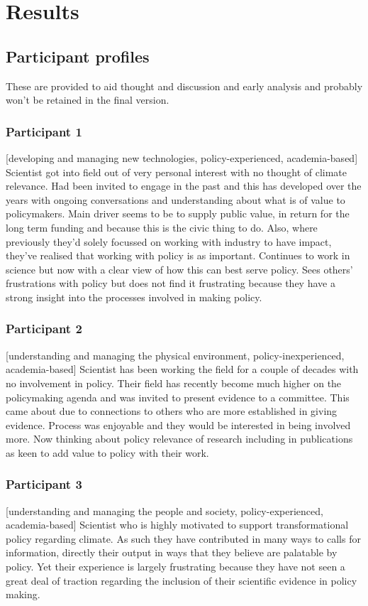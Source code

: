 \chapter{Results}\label{ch:results}
\section{Participant profiles}\label{sec:profiles}
These are provided to aid thought and discussion and early analysis and probably won't be retained in the final version.

\subsection{Participant 1}\label{sec:p1}
[developing and managing new technologies, policy-experienced, academia-based] Scientist got into field out of very personal interest with no thought of climate relevance. Had been invited to engage in the past and this has developed over the years with ongoing conversations and understanding about what is of value to policymakers. Main driver seems to be to supply public value, in return for the long term funding and because this is the civic thing to do. Also, where previously they'd solely focussed on working with industry to have impact, they've realised that working with policy is as important. Continues to work in science but now with a clear view of how this can best serve policy. Sees others' frustrations with policy but does not find it frustrating because they have a strong insight into the processes involved in making policy.

\subsection{Participant 2}\label{sec:p2}
[understanding and managing the physical environment, policy-inexperienced, academia-based] Scientist has been working the field for a couple of decades with no involvement in policy. Their field has recently become much higher on the policymaking agenda and was invited to present evidence to a committee. This came about due to connections to others who are more established in giving evidence. Process was enjoyable and they would be interested in being involved more. Now thinking about policy relevance of research including in publications as keen to add value to policy with their work.

\subsection{Participant 3}\label{sec:p3}
[understanding and managing the people and society, policy-experienced, academia-based] Scientist who is highly motivated to support transformational policy regarding climate. As such they have contributed in many ways to calls for information, directly their output in ways that they believe are palatable by policy. Yet their experience is largely frustrating because they have not seen a great deal of traction regarding the inclusion of their scientific evidence in policy making.

